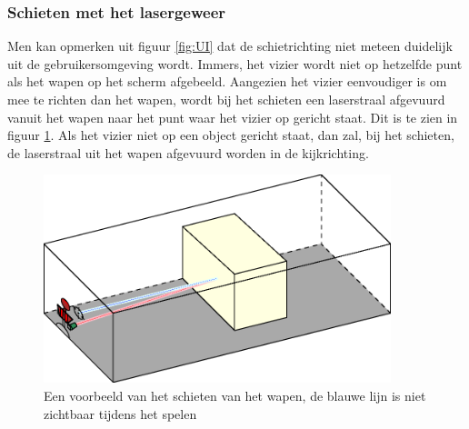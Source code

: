 \documentclass[a4paper,11pt, twoside]{article}
\begin{document}
    \subsubsection{Schieten met het lasergeweer}
    Men kan opmerken uit figuur \ref{fig:UI} dat de schietrichting niet meteen duidelijk uit de gebruikersomgeving wordt. Immers, het vizier wordt niet op hetzelfde punt als het wapen op het scherm afgebeeld. Aangezien het vizier eenvoudiger is om mee te richten dan het wapen, wordt bij het schieten een laserstraal afgevuurd vanuit het wapen naar het punt waar het vizier op gericht staat. Dit is te zien in figuur \ref{fig:COL}. Als het vizier niet op een object gericht staat, dan zal, bij het schieten, de laserstraal uit het wapen afgevuurd worden in de kijkrichting.

    \begin{figure}[H]
    \includegraphics[width=0.9\textwidth]{../Graphics/Collision.eps}
    \caption{Een voorbeeld van het schieten van het wapen, de blauwe lijn is niet zichtbaar tijdens het spelen}
    \label{fig:COL}
    \end{figure}
\end{document}
